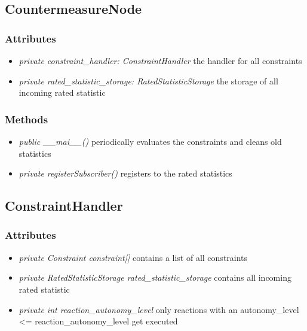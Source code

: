 \subsection{CountermeasureNode}
\subsubsection{Attributes}
\begin{itemize}
	\item \textit{ private constraint\_handler: ConstraintHandler }
		the handler for all constraints
	\item \textit{ private rated\_statistic\_storage: RatedStatisticStorage }
		the storage of all incoming rated statistic
\end{itemize}
\subsubsection{Methods}
\begin{itemize}
	\item \textit{ public \_\_mai\_\_() }
		periodically evaluates the constraints and cleans old statistics
	\item \textit{ private registerSubscriber() }
		registers to the rated statistics
\end{itemize}



\subsection{ConstraintHandler}
\subsubsection{Attributes}
\begin{itemize}
	\item \textit{ private  Constraint constraint[] }
		contains a list of all constraints
	\item \textit{ private  RatedStatisticStorage rated\_statistic\_storage }
		contains all incoming rated statistic
	\item \textit{ private  int reaction\_autonomy\_level }
		only reactions with an autonomy\_level <= reaction\_autonomy\_level get executed
\end{itemize}
